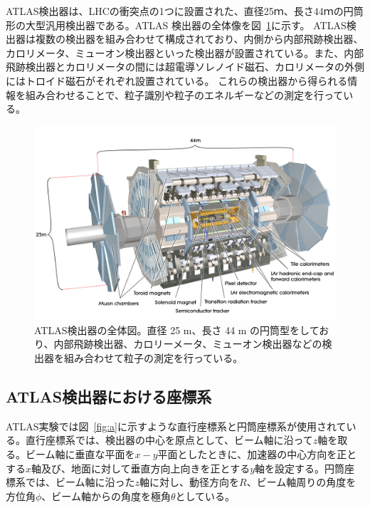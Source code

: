 ATLAS検出器は、LHCの衝突点の1つに設置された、直径25ｍ、長さ44ｍの円筒形の大型汎用検出器である\cite{Aad:1129811}。ATLAS 検出器の全体像を図~\ref{fig:ATLAS検出器}に示す。
ATLAS検出器は複数の検出器を組み合わせて構成されており、内側から内部飛跡検出器、カロリメータ、ミューオン検出器といった検出器が設置されている。また、内部飛跡検出器とカロリメータの間には超電導ソレノイド磁石、カロリメータの外側にはトロイド磁石がそれぞれ設置されている。
これらの検出器から得られる情報を組み合わせることで、粒子識別や粒子のエネルギーなどの測定を行っている。

\begin{figure}[tb]
  \centering
  \includegraphics[clip,width=12cm]{fig/2/0803012_01.jpg}
  \caption{ATLAS検出器の全体図\cite{Aad:1129811}。直径 25 m、長さ 44 m の円筒型をしており、内部飛跡検出器、カロリーメータ、ミューオン検出器などの検出器を組み合わせて粒子の測定を行っている。}
  \label{fig:ATLAS検出器}
\end{figure}

\subsection{ATLAS検出器における座標系}
ATLAS実験では図~\ref{fig:a}に示すような直行座標系と円筒座標系が使用されている。直行座標系では、検出器の中心を原点として、ビーム軸に沿って$z$軸を取る。ビーム軸に垂直な平面を$x-y$平面としたときに、加速器の中心方向を正とする$x$軸及び、地面に対して垂直方向上向きを正とする$y$軸を設定する。円筒座標系では、ビーム軸に沿った$z$軸に対し、動径方向を$R$、ビーム軸周りの角度を方位角$\phi$、ビーム軸からの角度を極角$\theta$としている。

